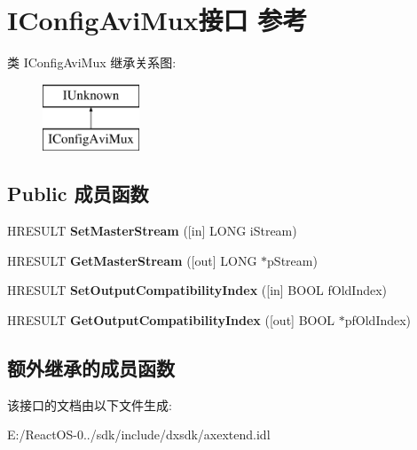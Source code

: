 \hypertarget{interface_i_config_avi_mux}{}\section{I\+Config\+Avi\+Mux接口 参考}
\label{interface_i_config_avi_mux}
类 I\+Config\+Avi\+Mux 继承关系图\+:\begin{figure}[H]
\begin{center}
\leavevmode
\includegraphics[height=2.000000cm]{interface_i_config_avi_mux}
\end{center}
\end{figure}
\subsection*{Public 成员函数}
\begin{DoxyCompactItemize}
\item 
\mbox{\label{interface_i_config_avi_mux_abc70331750e6d8825d97717daa0f6ab3}} 
H\+R\+E\+S\+U\+LT {\bfseries Set\+Master\+Stream} (\mbox{[}in\mbox{]} L\+O\+NG i\+Stream)
\item 
\mbox{\label{interface_i_config_avi_mux_a1bb792a214dc721cb5643cec238d34e1}} 
H\+R\+E\+S\+U\+LT {\bfseries Get\+Master\+Stream} (\mbox{[}out\mbox{]} L\+O\+NG $\ast$p\+Stream)
\item 
\mbox{\label{interface_i_config_avi_mux_a2c696bd10eddf91c0cc54ba96b939a4e}} 
H\+R\+E\+S\+U\+LT {\bfseries Set\+Output\+Compatibility\+Index} (\mbox{[}in\mbox{]} B\+O\+OL f\+Old\+Index)
\item 
\mbox{\label{interface_i_config_avi_mux_a49cdfb3b2ff15ded68a09be14f05b6b1}} 
H\+R\+E\+S\+U\+LT {\bfseries Get\+Output\+Compatibility\+Index} (\mbox{[}out\mbox{]} B\+O\+OL $\ast$pf\+Old\+Index)
\end{DoxyCompactItemize}
\subsection*{额外继承的成员函数}


该接口的文档由以下文件生成\+:\begin{DoxyCompactItemize}
\item 
E\+:/\+React\+O\+S-\/0../sdk/include/dxsdk/axextend.\+idl\end{DoxyCompactItemize}
